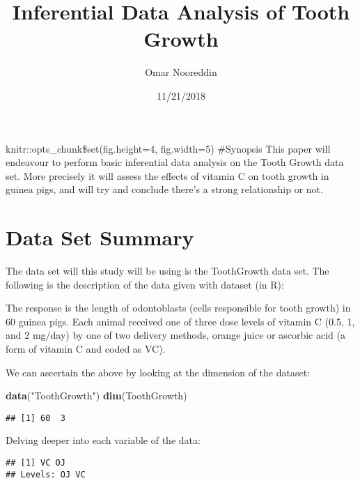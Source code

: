 \documentclass[]{article}
\title{Inferential Data Analysis of Tooth Growth}
\author{Omar Nooreddin}
\date{11/21/2018}
\newenvironment{Shaded}{\begin{snugshade}}{\end{snugshade}}
\newcommand{\KeywordTok}[1]{\textcolor[rgb]{0.13,0.29,0.53}{\textbf{#1}}}
\newcommand{\StringTok}[1]{\textcolor[rgb]{0.31,0.60,0.02}{#1}}
\newcommand{\OperatorTok}[1]{\textcolor[rgb]{0.81,0.36,0.00}{\textbf{#1}}}
\newcommand{\NormalTok}[1]{#1}
\begin{document}
\maketitle

knitr::opts\_chunk\$set(fig.height=4, fig.width=5) \#Synopsis This paper
will endeavour to perform basic inferential data analysis on the Tooth
Growth data set. More precisely it will assess the effects of vitamin C
on tooth growth in guinea pigs, and will try and conclude there's a
strong relationship or not.

\section{Data Set Summary}\label{data-set-summary}

The data set will this study will be using is the ToothGrowth data set.
The following is the description of the data given with dataset (in R):

The response is the length of odontoblasts (cells responsible for tooth
growth) in 60 guinea pigs. Each animal received one of three dose levels
of vitamin C (0.5, 1, and 2 mg/day) by one of two delivery methods,
orange juice or ascorbic acid (a form of vitamin C and coded as VC).

We can ascertain the above by looking at the dimension of the dataset:

\begin{Shaded}
\begin{Highlighting}[]
\KeywordTok{data}\NormalTok{(}\StringTok{"ToothGrowth"}\NormalTok{)}
\KeywordTok{dim}\NormalTok{(ToothGrowth)}
\end{Highlighting}
\end{Shaded}

\begin{verbatim}
## [1] 60  3
\end{verbatim}

Delving deeper into each variable of the data:

\begin{Shaded}
\end{Shaded}

\begin{verbatim}
## [1] VC OJ
## Levels: OJ VC
\end{verbatim}
\end{document}
